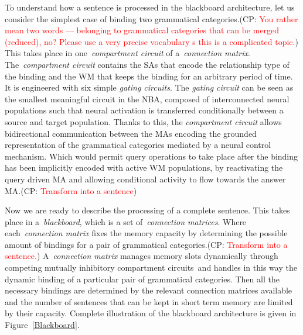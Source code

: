 \documentclass[10pt]{article}
\newcommand{\noteCP}[1]{(CP: \textcolor{red}{#1})}
\begin{document}
To understand how a sentence is processed in the blackboard
architecture, let us consider the simplest case of binding two
grammatical categories.\noteCP{You rather mean two words --- belonging
  to grammatical categories that can be merged (reduced), no? Please
  use a very precise vocabulary s this is a complicated topic.} This takes place in
one~\emph{compartment circuit} of a~\emph{connection matrix}.
The~\emph{compartment circuit} contains the SAs that encode the
relationship type of the binding and the WM that keeps the binding for
an arbitrary period of time. It is engineered with six simple
\emph{gating circuits}. The \emph{gating circuit} can be seen as the
smallest meaningful circuit in the NBA, composed of interconnected
neural populations such that neural activation is transferred
conditionally between a source and target population. Thanks to this,
the \emph{compartment circuit} allows bidirectional communication
between the MAs encoding the grounded representation of the
grammatical categories mediated by a neural control mechanism. Which
would permit query operations to take place after the binding has been
implicitly encoded with active WM populations, by reactivating the
query driven MA and allowing conditional activity to flow towards the
answer MA.\noteCP{Transform into a sentence}

Now we are ready to describe the processing of a complete sentence.
This takes place in a~\emph{blackboard}, which is a set
of~\emph{connection matrices}. Where each~\emph{connection matrix}
fixes the memory capacity by determining the possible amount of
bindings for a pair of grammatical categories.\noteCP{Transform into a sentence.} A~\emph{connection matrix} manages memory
slots dynamically through competing mutually inhibitory compartment
circuits~and handles in this way the dynamic binding of a particular
pair of grammatical categories. Then all the necessary bindings are
determined by the relevant connection matrices available and the
number of sentences that can be kept in short term memory are limited
by their capacity. Complete illustration of the blackboard
architecture is given in Figure~{\ref{Blackboard}}.
\end{document}
